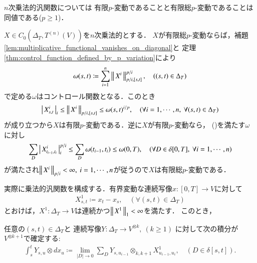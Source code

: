 	\begin{screen}
		\begin{thm}\label{thm:fin_p_var_and_fin_ttl_p_var_is_equiv_for_multiplicative}
			$n$次乗法的汎関数については
			有限$p$-変動であることと有限総$p$-変動であることは同値である($p \geq 1$)．
		\end{thm}
	\end{screen}
	
	\begin{prf}
		$X \in C_0 \left(\Delta_T,T^{(n)}(V) \right)$を$n$次乗法的とする．
		$X$が有限総$p$-変動ならば，補題\ref{lem:multiplicative_functional_vanishes_on_diagonal}と
		定理\ref{thm:control_function_defined_by_p_variation}により
		\begin{align}
			\omega(s,t) \coloneqq \sum_{i=1}^n \left\|\, X^i\, \right\|_{p/i,[s,t]}^{p/i},
			\quad ((s,t) \in \Delta_T)
		\end{align}
		で定める$\omega$はコントロール関数となる．このとき
		\begin{align}
			\left|\, X^i_{s,t}\, \right|_{i}
			\leq \left\|\, X^i\, \right\|_{p/i,[s,t]}
			\leq \omega(s,t)^{i/p},
			\quad (\forall i = 1,\cdots,n,\ \forall (s,t) \in \Delta_T)
		\end{align}
		が成り立つから$X$は有限$p$-変動である．逆に$X$が有限$p$-変動なら，
		()を満たす$\omega$に対し
		\begin{align}
			\sum_D \left|\, X^i_{t_{i-1},t_i}\, \right|_{i}^{p/i}
			\leq \sum_D \omega(t_{i-1},t_i)
			\leq \omega(0,T),
			\quad (\forall D \in \delta[0,T],\ \forall i=1,\cdots,n)
		\end{align}
		が満たされ$\Norm{X^i}{p/i} < \infty,\ i=1,\cdots,n$が従うので$X$は有限総$p$-変動である．
		\QED
	\end{prf}
	
	実際に乗法的汎関数を構成する．有界変動な連続写像$x:[0,T] \longrightarrow V$に対して
	\begin{align}
		X^1_{s,t} \coloneqq x_t - x_s,
		\quad (\forall (s,t) \in \Delta_T)
	\end{align}
	とおけば，$X^1:\Delta_T \longrightarrow V$は連続かつ$\left\|\, X^1\, \right\|_{1} < \infty$を満たす．
	このとき，
	\begin{screen}
		\begin{lem}\label{lem:def_integration_of_continuous_mapping_by_X_1}
			任意の$(s,t) \in \Delta_T$と
			連続写像$Y:\Delta_T \longrightarrow V^{\otimes k},\ (k \geq 1)$
			に対して次の積分が$V^{\otimes k+1}$で確定する:
			\begin{align}
				\int_s^t Y_{s,u} \otimes d x_u
				\coloneqq \lim_{|D| \to 0} \sum_{D} Y_{s,u_{i-1}} \otimes_{k,k+1} X^1_{u_{i-1},u_i},
				\quad (D \in \delta[s,t]).
				\label{eq:def_integration_of_continuous_mapping_by_X_1}
			\end{align}
		\end{lem}
	\end{screen}
	

